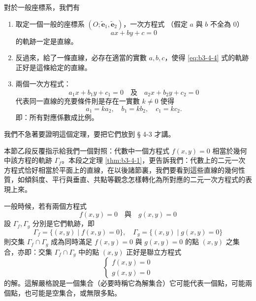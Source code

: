 對於一般座標系，我們有

\begin{theorem}
\label{thm:b3-4-1}
\begin{enumerate}[label=(\Roman*), leftmargin=2em]
  \item 取定一個一般的座標系 $(O; \tilde{\mathbf{e}}_1, \tilde{\mathbf{e}}_2)$，一次方程式
  （假定 $a$ 與 $b$ 不全為 0）
  \begin{equation}
  ax + by + c = 0
  \label{eq:b3-4-4}
  \end{equation}
  的軌跡一定是直線。
  \item 反過來，給了一條直線，必存在適當的實數 $a, b, c$，使得 \eqref{eq:b3-4-4} 式的軌跡正好是這條給定的直線。
  \item 兩個一次方程式：
  \[ a_1 x + b_1 y + c_1 = 0 \quad\text{及}\quad a_2 x + b_2 y + c_2 = 0 \]
  代表同一直線的充要條件則是存在一實數 $k \neq 0$ 使得
  \[ a_1 = k a_2, \quad b_1 = k b_2, \quad c_1 = k c_2. \]
  即：所有對應係數成比例。
\end{enumerate}
\end{theorem}

我們不急著要證明這個定理，要把它們放到 § 4-3 才講。

本節乙段反覆指示給我們一個對照：代數中一個方程式 $f(x, y) = 0$ 相當於幾何中該方程的軌跡 $\Gamma_f$。本段之定理 \ref{thm:b3-4-1}，更告訴我們：代數上的二元一次方程式恰好相當於平面上的直線，在以後諸節裏，我們要看到這些直線的幾何性質，如傾斜度、平行與垂直、共點等觀念怎樣轉化為所對應的二元一次方程式的表現上來。

一般時候，若有兩個方程式
\[ f(x, y) = 0 \quad\text{與}\quad g(x, y) = 0 \]
設 $\Gamma_f, \Gamma_g$ 分別是它們軌跡，即
\[ \Gamma_f = \{(x, y) \mid f(x, y) = 0\}, \quad \Gamma_g = \{(x, y) \mid g(x, y) = 0\} \]
則交集 $\Gamma_f \cap \Gamma_g$ 成為同時滿足 $f(x, y) = 0$ 與 $g(x, y) = 0$ 的點 $(x, y)$ 之集合，亦即：交集 $\Gamma_f \cap \Gamma_g$ 中的點 $(x, y)$ 正好是聯立方程式
\[ \begin{cases} f(x, y) = 0 \\ g(x, y) = 0 \end{cases} \]
的解。這解嚴格說是一個集合（必要時稱它為解集合）它可能代表一個點，可能兩個點，也可能是空集合，或無限多點。

